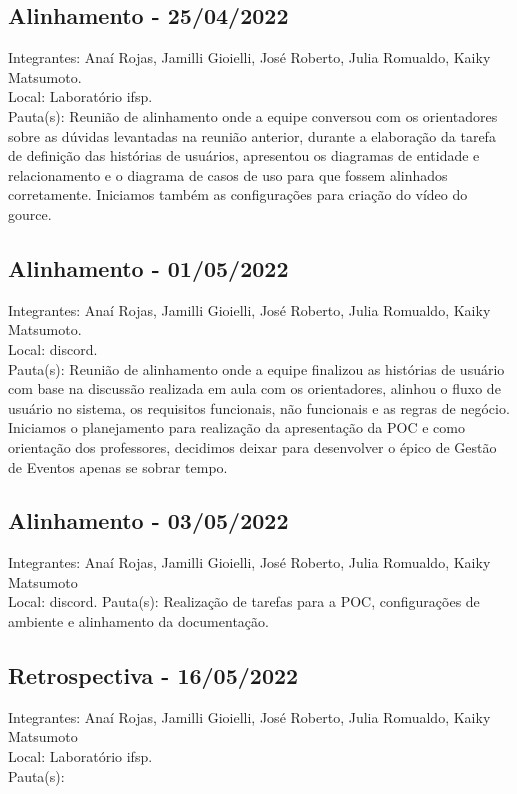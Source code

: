 \subsection{Alinhamento - 25/04/2022}
\noindent Integrantes: Anaí Rojas, Jamilli Gioielli, José Roberto, Julia Romualdo, Kaiky Matsumoto. \\
Local: Laboratório \acs{ifsp}.\\
Pauta(s): Reunião de alinhamento onde a equipe conversou com os orientadores sobre as dúvidas levantadas na reunião anterior, durante a elaboração da tarefa de definição das histórias de usuários, apresentou os diagramas de entidade e relacionamento e o diagrama de casos de uso para que fossem alinhados corretamente. Iniciamos também as configurações para criação do vídeo do \gls{gource}.

\subsection{Alinhamento - 01/05/2022}
\noindent Integrantes: Anaí Rojas, Jamilli Gioielli, José Roberto, Julia Romualdo, Kaiky Matsumoto. \\
Local: \gls{discord}.\\
Pauta(s): Reunião de alinhamento onde a equipe finalizou as histórias de usuário com base na discussão realizada em aula com os orientadores, alinhou o fluxo de usuário no sistema, os requisitos funcionais, não funcionais e as regras de negócio. Iniciamos o planejamento para realização da apresentação da \acs{POC} e como orientação dos professores, decidimos deixar para desenvolver o épico de Gestão de Eventos apenas se sobrar tempo. 

\subsection{Alinhamento - 03/05/2022}
\noindent Integrantes: Anaí Rojas, Jamilli Gioielli, José Roberto, Julia Romualdo, Kaiky Matsumoto \\
Local: \gls{discord}.
Pauta(s): Realização de tarefas para a \acs{POC}, configurações de ambiente e alinhamento da documentação.

\subsection{Retrospectiva - 16/05/2022}
\noindent Integrantes: Anaí Rojas, Jamilli Gioielli, José Roberto, Julia Romualdo, Kaiky Matsumoto \\
Local: Laboratório \acs{ifsp}. \\
Pauta(s):